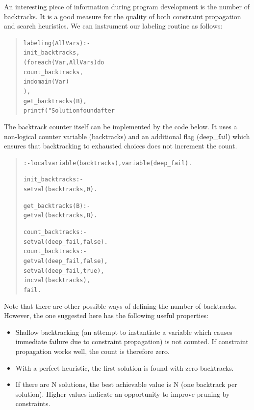 \label{countbt}
An interesting piece of information during program development is the
number of backtracks. It is a good measure for the quality of
both constraint propagation and search heuristics.
We can instrument our labeling routine as follows:
\begin{quote}\begin{alltt}
labeling(AllVars) :-
        init_backtracks,
        ( foreach(Var, AllVars) do
            count_backtracks,       %
            indomain(Var)
        ),
        get_backtracks(B),
        printf("Solution found after %
\end{alltt}\end{quote}
The backtrack counter itself can be implemented by the code below.
It uses a non-logical counter variable (backtracks) and an additional
flag (deep\_fail) which ensures that backtracking to exhausted choices
does not increment the count.
\begin{quote}\begin{alltt}
:- local variable(backtracks), variable(deep_fail).

init_backtracks :-
        setval(backtracks,0).

get_backtracks(B) :-
        getval(backtracks,B).

count_backtracks :-
        setval(deep_fail,false).
count_backtracks :-
        getval(deep_fail,false),        %
        setval(deep_fail,true),
        incval(backtracks),
        fail.
\end{alltt}\end{quote}
Note that there are other possible ways of defining the number of backtracks.
However, the one suggested here has the following useful properties:
\begin{itemize}
\item Shallow backtracking (an attempt to instantiate a variable which
    causes immediate failure due to constraint propagation) is not counted.
    If constraint propagation works well, the count is therefore zero.
\item With a perfect heuristic, the first solution is found with zero
    backtracks.
\item If there are N solutions, the best achievable value is N (one backtrack
    per solution). Higher values indicate an opportunity to improve pruning
    by constraints.
\end{itemize}


